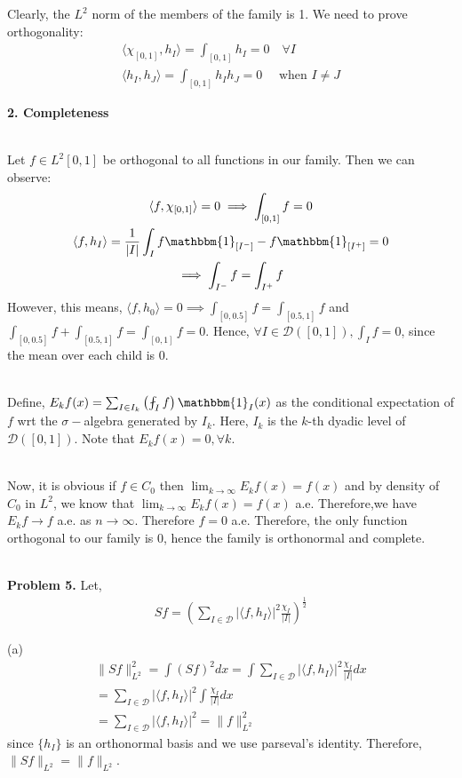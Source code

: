 \documentclass{article}
\newcommand{\D}{\mathcal{D}}
\begin{document}
Clearly, the $L^2$ norm of the members of the family is 1. We need to prove orthogonality:
\begin{gather*}
    \langle\chi_{[0,1]}, h_I \rangle = \int_{[0,1]} h_I = 0 \quad \forall I\\
    \langle h_I, h_J \rangle = \int_{[0,1]} h_Ih_J = 0 \quad \text{ when } I\neq J
\end{gather*}

\textbf{2. Completeness}
\\~

Let $f \in L^2[0,1]$ be orthogonal to all functions in our family. Then we can observe:
\begin{gather*}
    \langle f, \chi_{[0,1]} \rangle = 0 \implies \int_{[0,1]} f = 0\\
    \langle f, h_I \rangle = \frac{1}{|I|} \int_{I} f\mathbbm{1}_{[I^-]} - f\mathbbm{1}_{[I^+]} = 0 \\
    \implies  \int_{I^-} f = \int_{I^+} f
\end{gather*}
However, this means, $\langle f, h_0 \rangle = 0 \implies \int_{[0,0.5]}f = \int_{[0.5,1]}f$ and $\int_{[0,0.5]}f + \int_{[0.5,1]}f = \int_{[0,1]}f = 0$. Hence, $\forall I \in \D([0,1]), \int_{I} f = 0$, since the mean over each child is 0.
\\~

Define, $E_k f(x) = \sum_{I \in I_k} \left(\fint_{I} f\right)\mathbbm{1}_I (x)$ as the conditional expectation of $f$ wrt the $\sigma-$algebra generated by $I_k$. Here, $I_k$ is the $k$-th dyadic level of $\D([0,1])$. Note that $E_k f(x) = 0, \forall k$.
\\~

Now, it is obvious if $f \in C_0$ then $\lim_{k\to \infty} E_k f(x) = f(x)$ and by density of $C_0$ in $L^2$, we know that $\lim_{k\to \infty} E_k f(x) = f(x)$ a.e. Therefore,we have $E_k f \to f$ a.e. as $n \to \infty$. Therefore $f=0$ a.e. Therefore, the only function orthogonal to our family is 0, hence the family is orthonormal and complete.
\\~

\textbf{Problem 5. } Let,
\begin{gather*}
    Sf = \left( \sum_{I \in \D} |\langle f, h_I\rangle|^2 \frac{\chi_I}{|I|} \right)^{\frac{1}{2}}
\end{gather*}

(a)
\begin{gather*}
    \lVert Sf \rVert_{L^2}^2 = \int (Sf)^2 dx = \int \sum_{I \in \D} |\langle f, h_I\rangle|^2 \frac{\chi_I}{|I|} dx \\
    = \sum_{I \in \D} |\langle f, h_I\rangle|^2 \int \frac{\chi_I}{|I|} dx\\
    = \sum_{I \in \D} |\langle f, h_I\rangle|^2
    = \lVert f \rVert_{L^2}^2
\end{gather*}
since $\{h_I\}$ is an orthonormal basis and we use parseval's identity. Therefore, $\lVert Sf \rVert_{L^2} = \lVert f \rVert_{L^2}$.
\\~
\end{document}
